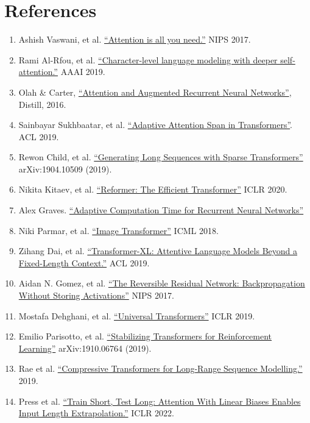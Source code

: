 \documentclass[12pt]{article}
\begin{document}
\section{References}
\begin{enumerate}
\item Ashish Vaswani, et al. \href{http://papers.nips.cc/paper/7181-attention-is-all-you-need.pdf}{``Attention is all you need.''} NIPS 2017.
\item Rami Al-Rfou, et al. \href{https://arxiv.org/abs/1808.04444}{``Character-level language modeling with deeper self-attention.''} AAAI 2019.
\item Olah \& Carter, \href{http://doi.org/10.23915/disti}{``Attention and Augmented Recurrent Neural Networks''}, Distill, 2016.
\item Sainbayar Sukhbaatar, et al. \href{https://arxiv.org/abs/1905.07799}{``Adaptive Attention Span in Transformers''}. ACL 2019.
\item Rewon Child, et al. \href{https://arxiv.org/abs/1904.10509}{``Generating Long Sequences with Sparse Transformers''} arXiv:1904.10509 (2019).
\item Nikita Kitaev, et al. \href{https://arxiv.org/abs/2001.04451}{``Reformer: The Efficient Transformer''} ICLR 2020.
\item Alex Graves. \href{https://arxiv.org/abs/1603.08983}{``Adaptive Computation Time for Recurrent Neural Networks''}
\item Niki Parmar, et al. \href{https://arxiv.org/abs/1802.05751}{``Image Transformer''} ICML 2018.
\item Zihang Dai, et al. \href{https://arxiv.org/abs/1901.02860}{``Transformer-XL: Attentive Language Models Beyond a Fixed-Length Context.''} ACL 2019.
\item Aidan N. Gomez, et al. \href{https://arxiv.org/abs/1707.04585}{``The Reversible Residual Network: Backpropagation Without Storing Activations''} NIPS 2017.
\item Mostafa Dehghani, et al. \href{https://arxiv.org/abs/1807.03819}{``Universal Transformers''} ICLR 2019.
\item Emilio Parisotto, et al. \href{https://arxiv.org/abs/1910.06764}{``Stabilizing Transformers for Reinforcement Learning''} arXiv:1910.06764 (2019).
\item Rae et al. \href{https://arxiv.org/abs/1911.05507}{“Compressive Transformers for Long-Range Sequence Modelling.”} 2019.
\item Press et al. \href{https://arxiv.org/abs/2108.12409}{“Train Short, Test Long: Attention With Linear Biases Enables Input Length Extrapolation.”} ICLR 2022.

\end{enumerate}
\end{document}
